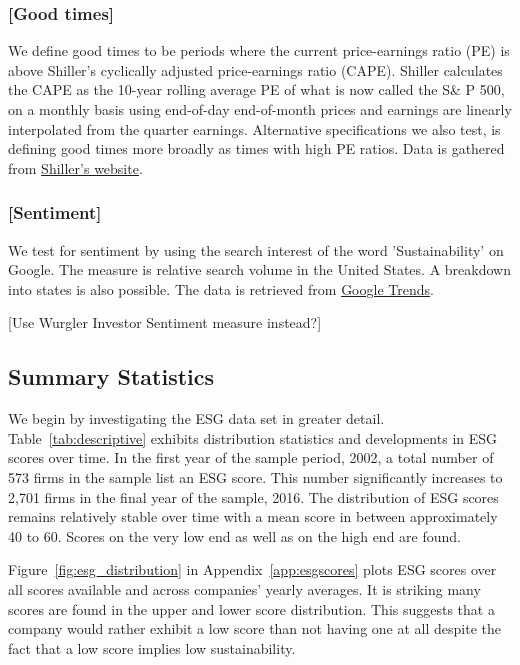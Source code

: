 \documentclass[11pt]{article}
\begin{document}
\subsubsection*{[Good times]}
We define good times to be periods where the current price-earnings ratio (PE) is above Shiller's cyclically adjusted price-earnings ratio (CAPE). Shiller calculates the CAPE as the 10-year rolling average PE of what is now called the S\& P 500, on a monthly basis using end-of-day end-of-month prices and earnings are linearly interpolated from the quarter earnings. Alternative specifications we also test, is defining good times more broadly as times with high PE ratios. Data is gathered from \href{http://www.econ.yale.edu/~shiller/data.htm}{Shiller's website}.

\subsubsection*{[Sentiment]}
We test for sentiment by using the search interest of the word 'Sustainability' on Google. The measure is relative search volume in the United States. A breakdown into states is also possible. The data is retrieved from \href{}{Google Trends}.

[Use Wurgler Investor Sentiment measure instead?]

\subsection{Summary Statistics}

We begin by investigating the ESG data set in greater detail. Table~\ref{tab:descriptive} exhibits distribution statistics and developments in ESG scores over time. In the first year of the sample period, 2002, a total number of 573 firms in the sample list an ESG score. This number significantly increases to 2,701 firms in the final year of the sample, 2016. The distribution of ESG scores remains relatively stable over time with a mean score in between approximately 40 to 60. Scores on the very low end as well as on the high end are found.

Figure~\ref{fig:esg_distribution} in Appendix~\ref{app:esgscores} plots ESG scores over all scores available and across companies' yearly averages. It is striking many scores are found in the upper and lower score distribution. This suggests that a company would rather exhibit a low score than not having one at all despite the fact that a low score implies low sustainability.
\end{document}
